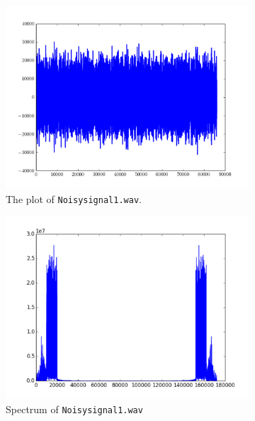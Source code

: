 \begin{figure}
\captionsetup[subfigure]{justification=centering}
\centering
\begin{subfigure}{.5\textwidth}
    \centering
    \includegraphics[width=\linewidth]{figures/noisy.pdf}
    \caption{The plot of \texttt{Noisysignal1.wav}.}
    \label{fig:noisysignal}
\end{subfigure}%
\begin{subfigure}{.5\textwidth}
    \centering
    \includegraphics[width=\linewidth]{figures/noisyspec.pdf}
    \caption{Spectrum of \texttt{Noisysignal1.wav}}
    \label{fig:noisyspec}
\end{subfigure}
\caption{}
\end{figure}

